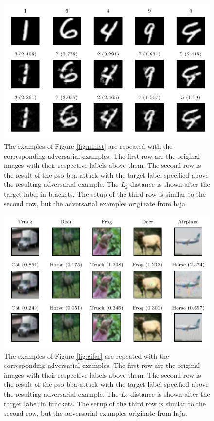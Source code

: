\begin{figure}
\centering
\includegraphics[width=\textwidth]{Images/mnist_comparison.pdf}
\caption[Visual comparison of the adversarial MNIST examples of different attacks]{The examples of Figure \ref{fig:mnist} are repeated with the corresponding adversarial examples. The first row are the original images with their respective labels above them. The second row is the result of the \gls{pso}-\gls{bba} attack with the target label specified above the resulting adversarial example. The $L_2$-distance is shown after the target label in brackets. The setup of the third row is similar to the second row, but the adversarial examples originate from \gls{hsja}. }
\label{fig:mnist_comparison}
\end{figure}

\begin{figure}
\centering
\includegraphics[width=\textwidth]{Images/cifar_comparison.pdf}
\caption[Visual comparison of the adversarial CIFAR examples of different attacks]{The examples of Figure \ref{fig:cifar} are repeated with the corresponding adversarial examples. The first row are the original images with their respective labels above them. The second row is the result of the \gls{pso}-\gls{bba} attack with the target label specified above the resulting adversarial example. The $L_2$-distance is shown after the target label in brackets. The setup of the third row is similar to the second row, but the adversarial examples originate from \gls{hsja}. }
\label{fig:cifar_comparison}
\end{figure}